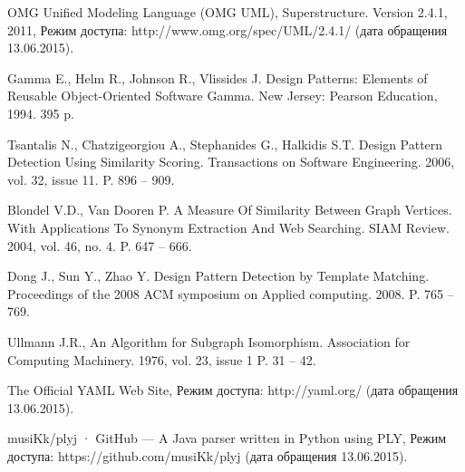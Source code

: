 \begin{thebibliography}{1}

\begin{flushleft}
OMG Unified Modeling Language (OMG UML), Superstructure. Version 2.4.1, 2011, Режим доступа: http://www.omg.org/spec/UML/2.4.1/ (дата обращения 13.06.2015).
\end{flushleft}

\begin{flushleft}
Gamma E., Helm R., Johnson R., Vlissides J. Design Patterns: Elements of Reusable Object-Oriented Software Gamma. New Jersey: Pearson Education, 1994. 395 p.
\end{flushleft}

\begin{flushleft}
Tsantalis N., Chatzigeorgiou A., Stephanides G., Halkidis S.T. Design Pattern Detection Using Similarity Scoring. Transactions on Software Engineering. 2006, vol. 32, issue 11. P. 896 – 909.
\end{flushleft}

\begin{flushleft}
Blondel V.D., Van Dooren P. A Measure Of Similarity Between Graph Vertices. With Applications To Synonym Extraction And Web Searching. SIAM Review. 2004, vol. 46, no. 4. P. 647 – 666.
\end{flushleft}

\begin{flushleft}
Dong J., Sun Y., Zhao Y. Design Pattern Detection by Template Matching. Proceedings of the 2008 ACM symposium on Applied computing. 2008. P. 765 – 769.
\end{flushleft}

\begin{flushleft}
Ullmann J.R., An Algorithm for Subgraph Isomorphism. Association for Computing Machinery. 1976, vol. 23, issue 1 P. 31 – 42.
\end{flushleft}

\begin{flushleft}
The Official YAML Web Site, Режим доступа: http://yaml.org/ (дата обращения 13.06.2015).
\end{flushleft}

\begin{flushleft}
musiKk/plyj · GitHub --- A Java parser written in Python using PLY, Режим доступа: https://github.com/musiKk/plyj (дата обращения 13.06.2015).
\end{flushleft}


\end{thebibliography}
